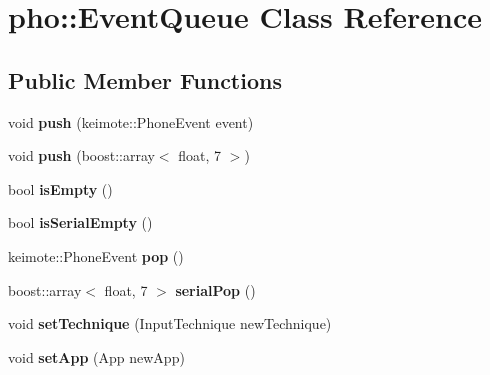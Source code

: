 \hypertarget{classpho_1_1EventQueue}{\section{pho\-:\-:Event\-Queue Class Reference}
\label{classpho_1_1EventQueue}
}
\subsection*{Public Member Functions}
\begin{DoxyCompactItemize}
\item 
\hypertarget{classpho_1_1EventQueue_a8c35e3bd373ab5df1cdc091a3ab5439f}{void {\bfseries push} (keimote\-::\-Phone\-Event event)}\label{classpho_1_1EventQueue_a8c35e3bd373ab5df1cdc091a3ab5439f}

\item 
\hypertarget{classpho_1_1EventQueue_a4ce35212696d3ae18e2ac6801733d6ca}{void {\bfseries push} (boost\-::array$<$ float, 7 $>$)}\label{classpho_1_1EventQueue_a4ce35212696d3ae18e2ac6801733d6ca}

\item 
\hypertarget{classpho_1_1EventQueue_a640119cdaa3573d8ed0f7664faae6ec4}{bool {\bfseries is\-Empty} ()}\label{classpho_1_1EventQueue_a640119cdaa3573d8ed0f7664faae6ec4}

\item 
\hypertarget{classpho_1_1EventQueue_af652b05c591ba0a166a9a60847f9cb7d}{bool {\bfseries is\-Serial\-Empty} ()}\label{classpho_1_1EventQueue_af652b05c591ba0a166a9a60847f9cb7d}

\item 
\hypertarget{classpho_1_1EventQueue_ac20b80f15fc7e02b809487213fe76cc1}{keimote\-::\-Phone\-Event {\bfseries pop} ()}\label{classpho_1_1EventQueue_ac20b80f15fc7e02b809487213fe76cc1}

\item 
\hypertarget{classpho_1_1EventQueue_ac6d27beddc1129d8f42204d0fe00d4ce}{boost\-::array$<$ float, 7 $>$ {\bfseries serial\-Pop} ()}\label{classpho_1_1EventQueue_ac6d27beddc1129d8f42204d0fe00d4ce}

\item 
\hypertarget{classpho_1_1EventQueue_aedbec8b87281f1c2b070df9d92faf917}{void {\bfseries set\-Technique} (Input\-Technique new\-Technique)}\label{classpho_1_1EventQueue_aedbec8b87281f1c2b070df9d92faf917}

\item 
\hypertarget{classpho_1_1EventQueue_ae03b167d6ac48dd2b45fce2a46d228d6}{void {\bfseries set\-App} (App new\-App)}\label{classpho_1_1EventQueue_ae03b167d6ac48dd2b45fce2a46d228d6}


\end{DoxyCompactItemize}
